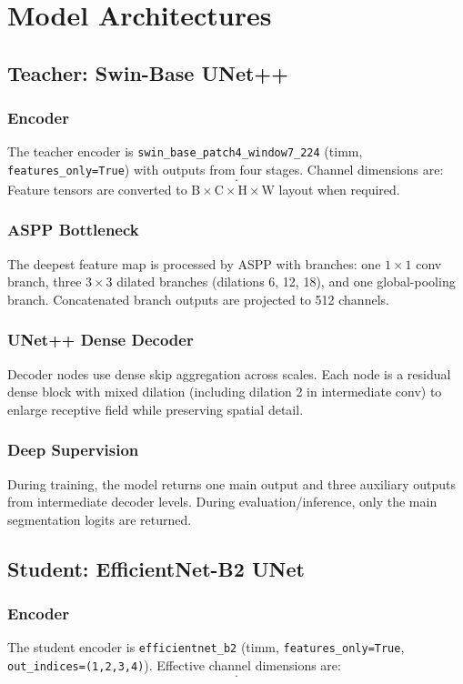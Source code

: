 \documentclass[journal]{IEEEtran}
\begin{document}
\section{Model Architectures}
\subsection{Teacher: Swin-Base UNet++}
\subsubsection{Encoder}
The teacher encoder is \texttt{swin\_base\_patch4\_window7\_224} (timm, \texttt{features\_only=True}) with outputs from four stages. Channel dimensions are:
\begin{equation}
[128,\;256,\;512,\;1024].
\end{equation}
Feature tensors are converted to $\text{B}\times\text{C}\times\text{H}\times\text{W}$ layout when required.

\subsubsection{ASPP Bottleneck}
The deepest feature map is processed by ASPP with branches: one $1\times1$ conv branch, three $3\times3$ dilated branches (dilations 6, 12, 18), and one global-pooling branch. Concatenated branch outputs are projected to 512 channels.

\subsubsection{UNet++ Dense Decoder}
Decoder nodes use dense skip aggregation across scales. Each node is a residual dense block with mixed dilation (including dilation 2 in intermediate conv) to enlarge receptive field while preserving spatial detail.

\subsubsection{Deep Supervision}
During training, the model returns one main output and three auxiliary outputs from intermediate decoder levels. During evaluation/inference, only the main segmentation logits are returned.

\subsection{Student: EfficientNet-B2 UNet}
\subsubsection{Encoder}
The student encoder is \texttt{efficientnet\_b2} (timm, \texttt{features\_only=True}, \texttt{out\_indices=(1,2,3,4)}). Effective channel dimensions are:
\begin{equation}
[24,\;48,\;120,\;352].
\end{equation}
\end{document}
